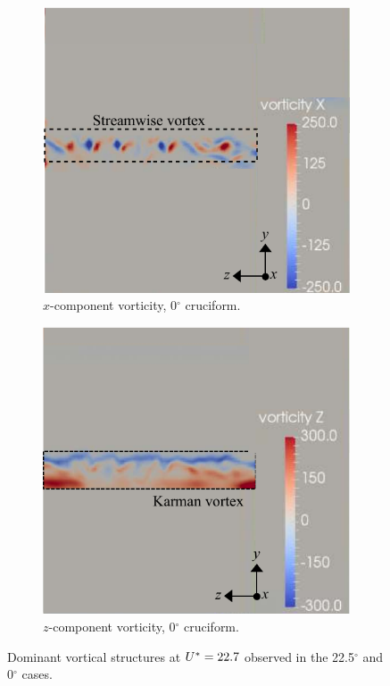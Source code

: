 \documentclass[oneside]{utmthesis}
\begin{document}
\begin{figure}[H]
  \begin{subfigure}[h]{0.48\textwidth}
    \centering
    \includegraphics[width=1\textwidth]{figs/vorx00}
    \caption{$x$-component vorticity, 0$^{\circ}$ cruciform.}
    \label{fig:vorx00}
  \end{subfigure}
  \hfill
  \begin{subfigure}[h]{0.48\textwidth}
    \centering
    \includegraphics[width=1\textwidth]{figs/vorz00}
    \caption{$z$-component vorticity, 0$^{\circ}$ cruciform.}
    \label{fig:vorz00}
  \end{subfigure}

  \caption{Dominant vortical structures at $U^{*} = 22.7$ observed in the 22.5$^{\circ}$ and 0$^{\circ}$ cases.} \label{fig:vortStruct22500}
\end{figure}
\end{document}
